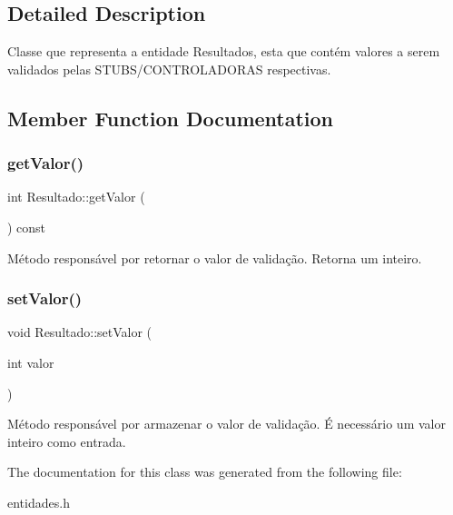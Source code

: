 \subsection{Detailed Description}
Classe que representa a entidade Resultados, esta que contém valores a serem validados pelas S\+T\+U\+B\+S/\+C\+O\+N\+T\+R\+O\+L\+A\+D\+O\+R\+AS respectivas. 

\subsection{Member Function Documentation}
\mbox{\label{classResultado_a029dc1436d6ed7963b5b90400e972e15}} 
\subsubsection{\texorpdfstring{get\+Valor()}{getValor()}}
{\footnotesize\ttfamily int Resultado\+::get\+Valor (\begin{DoxyParamCaption}{ }\end{DoxyParamCaption}) const\hspace{0.3cm}{\ttfamily [inline]}}

Método responsável por retornar o valor de validação. Retorna um inteiro. \mbox{\label{classResultado_ab0c3c0ed280eefb95e89d90dc7e239e2}} 
\subsubsection{\texorpdfstring{set\+Valor()}{setValor()}}
{\footnotesize\ttfamily void Resultado\+::set\+Valor (\begin{DoxyParamCaption}\item[{int}]{valor }\end{DoxyParamCaption})\hspace{0.3cm}{\ttfamily [inline]}}

Método responsável por armazenar o valor de validação. É necessário um valor inteiro como entrada. 

The documentation for this class was generated from the following file\+:\begin{DoxyCompactItemize}
\item 
entidades.\+h\end{DoxyCompactItemize}
